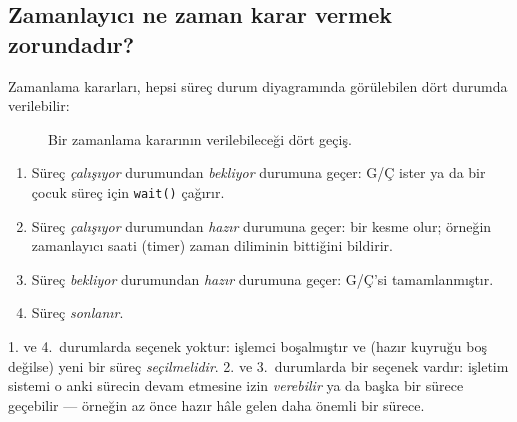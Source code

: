\documentclass[11pt,a4paper]{article}
\newcommand{\cmd}[1]{\texttt{#1}}
\begin{document}
\subsection{Zamanlayıcı ne zaman karar vermek zorundadır?}

Zamanlama kararları, hepsi süreç durum diyagramında görülebilen dört durumda verilebilir:

\begin{figure}[H]
\centering
{}
\caption{Bir zamanlama kararının verilebileceği dört geçiş.}
\end{figure}

\begin{enumerate}[leftmargin=1.4em]
  \item Süreç \emph{çalışıyor} durumundan \emph{bekliyor} durumuna geçer: G/Ç ister ya da bir çocuk süreç için \cmd{wait()} çağırır.
  \item Süreç \emph{çalışıyor} durumundan \emph{hazır} durumuna geçer: bir kesme olur; örneğin zamanlayıcı saati (timer) zaman diliminin bittiğini bildirir.
  \item Süreç \emph{bekliyor} durumundan \emph{hazır} durumuna geçer: G/Ç'si tamamlanmıştır.
  \item Süreç \emph{sonlanır}.
\end{enumerate}

1. ve 4.~durumlarda seçenek yoktur: işlemci boşalmıştır ve (hazır kuyruğu boş değilse) yeni bir süreç \emph{seçilmelidir}. 2. ve 3.~durumlarda bir seçenek vardır: işletim sistemi o anki sürecin devam etmesine izin \emph{verebilir} ya da başka bir sürece geçebilir --- örneğin az önce hazır hâle gelen daha önemli bir sürece.
\end{document}
